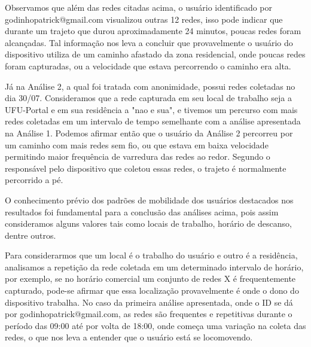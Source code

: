 \documentclass[12pt, %
openright, 
oneside,
a4paper,
brazil]{facom-ufu-abntex2}
\begin{document}
Observamos que além das redes citadas acima, o usuário identificado por godinhopatrick@gmail.com visualizou outras 12 redes, isso pode indicar que durante um trajeto que durou aproximadamente 24 minutos, poucas redes foram alcançadas. Tal informação nos leva a concluir que provavelmente o usuário do dispositivo utiliza de um caminho afastado da zona residencial, onde poucas redes foram capturadas, ou a velocidade que estava percorrendo o caminho era alta. 
 
Já na Análise 2, a qual foi tratada com anonimidade, possui redes coletadas no dia 30/07. Consideramos que a rede capturada em seu local de trabalho seja a UFU-Portal e em sua residência a "nao e sua", e tivemos um percurso com mais redes coletadas em um intervalo de tempo semelhante com a análise apresentada na Análise 1. Podemos afirmar então que o usuário da Análise 2 percorreu por um caminho com mais redes sem fio, ou que estava em baixa velocidade permitindo maior frequência de varredura das redes ao redor. Segundo o responsável pelo dispositivo que coletou essas redes, o trajeto é normalmente percorrido a pé.

O conhecimento prévio dos padrões de mobilidade dos usuários destacados nos resultados foi fundamental para a conclusão das análises acima, pois assim consideramos alguns valores tais como locais de trabalho, horário de descanso, dentre outros.

Para considerarmos que um local é o trabalho do usuário e outro é a residência, analisamos a repetição da rede coletada em um determinado intervalo de horário, por exemplo, se no horário comercial um conjunto de redes X é frequentemente capturado, pode-se afirmar que essa localização provavelmente é onde o dono do dispositivo trabalha. No caso da primeira análise apresentada, onde o ID se dá por godinhopatrick@gmail.com, as redes são frequentes e repetitivas durante o período das 09:00 até por volta de 18:00, onde começa uma variação na coleta das redes, o que nos leva a entender que o usuário está se locomovendo.
\end{document}
